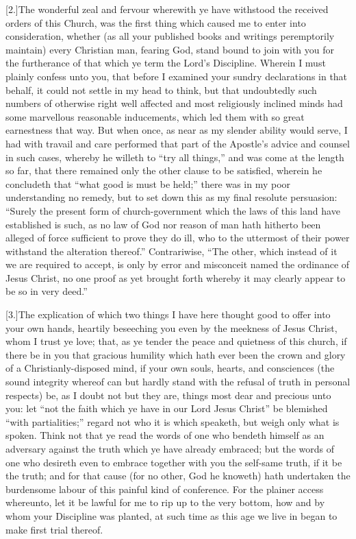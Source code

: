 [2.]The wonderful zeal and fervour wherewith ye have withstood the received orders of this Church, was the first thing which caused me to enter into consideration, whether (as all your published books and writings peremptorily maintain) every Christian man, fearing God, stand bound to join with you for the furtherance of that which ye term the Lord’s Discipline. Wherein I must plainly confess unto you, that before I examined your sundry declarations in that behalf, it could not settle in my head to think, but that undoubtedly such numbers of otherwise right well affected and most religiously inclined minds had some marvellous reasonable inducements, which led them with so great earnestness that way. But when once, as near as my slender ability would serve, I had with travail and care performed that part of the Apostle’s advice and counsel in such cases, whereby he willeth to “try all things,” and was come at the length so far, that there remained only the other clause to be satisfied, wherein he concludeth that “what good is must be held;” there was in my poor understanding no remedy, but to set down this as my final resolute persuasion: “Surely the present form of church-government which the laws of this land have established is such, as no law of God nor reason of man hath hitherto been alleged of force sufficient to prove they do ill, who to the uttermost of their power withstand the alteration thereof.” Contrariwise, “The other, which instead of it we are required to accept, is only by error and misconceit named the ordinance of Jesus Christ, no one proof as yet brought forth whereby it may clearly appear to be so in very deed.”

[3.]The explication of which two things I have here thought good to offer into your own hands, heartily beseeching you even by the meekness of Jesus Christ, whom I trust ye love; that, as ye tender the peace and quietness of this church, if there be in you that gracious humility which hath ever been the crown and glory of a Christianly-disposed mind, if your own souls, hearts, and consciences (the sound integrity whereof can but hardly stand with the refusal of truth in personal respects) be, as I doubt not but they are, things most dear and precious unto you: let “not the faith which ye have in our Lord Jesus Christ” be blemished “with partialities;” regard not who it is which speaketh, but weigh only what is spoken. Think not that ye read the words of one who bendeth himself as an adversary against the truth which ye have already embraced; but the words of one who desireth even to embrace together with you the self-same truth, if it be the truth; and for that cause (for no other, God he knoweth) hath undertaken the burdensome labour of this painful kind of conference. For the plainer access whereunto, let it be lawful for me to rip up to the very bottom, how and by whom your Discipline was planted, at such time as this age we live in began to make first trial thereof.

